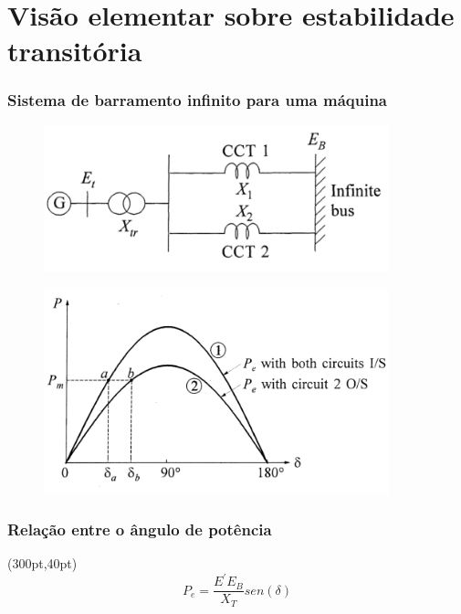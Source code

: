 \section{Visão elementar sobre estabilidade transitória}
\begin{frame}
\frametitle{Sistema de barramento infinito para uma máquina}
\begin{figure}[h!]
\begin{center}
    \includegraphics[width=10cm]{imagens/maq1.png}  
\end{center}
\label{maq1} 
\end{figure}
\end{frame}
	
\begin{frame}

\begin{figure}[h!]
\begin{left}
    \includegraphics[width=10cm]{imagens/maq4.png}  
\end{left}
\label{maq4} 
\end{figure}


\frametitle{Relação entre o ângulo de potência}
\begin{textblock*}{10pt}(300pt,40pt)
\small
\begin{equation*}
   P_{e}=\frac{E^{'}E_B}{X_T}sen(\delta)
\end{equation*}
\end{textblock*}
\end{frame}



